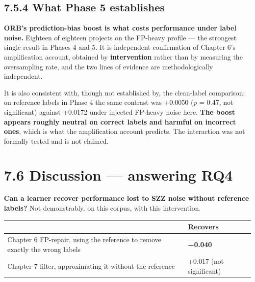 \subsection{7.5.4 What Phase 5
establishes}\label{what-phase-5-establishes}

\textbf{ORB's prediction-bias boost is what costs performance under
label noise.} Eighteen of eighteen projects on the FP-heavy profile ---
the strongest single result in Phases 4 and 5. It is independent
confirmation of Chapter 6's amplification account, obtained by
\textbf{intervention} rather than by measuring the oversampling rate,
and the two lines of evidence are methodologically independent.

It is also consistent with, though not established by, the clean-label
comparison: on reference labels in Phase 4 the same contrast was +0.0050
(\emph{p} = 0.47, not significant) against +0.0172 under injected
FP-heavy noise here. \textbf{The boost appears roughly neutral on
correct labels and harmful on incorrect ones}, which is what the
amplification account predicts. The interaction was not formally tested
and is not claimed.

\section{7.6 Discussion --- answering
RQ4}\label{discussion-answering-rq4}

\textbf{Can a learner recover performance lost to SZZ noise without
reference labels?} Not demonstrably, on this corpus, with this
intervention.

\begin{longtable}[]{@{}
  >{\raggedright\arraybackslash}p{}
  >{\raggedright\arraybackslash}p{}@{}}
\toprule\noalign{}
\begin{minipage}[b]{\linewidth}\raggedright
\end{minipage} & \begin{minipage}[b]{\linewidth}\raggedright
Recovers
\end{minipage} \\
\midrule\noalign{}
\endhead
\bottomrule\noalign{}
\endlastfoot
Chapter 6 FP-repair, using the reference to remove exactly the wrong
labels & \textbf{+0.040} \\
Chapter 7 filter, approximating it without the reference & +0.017 (not
significant) \\
\end{longtable}

